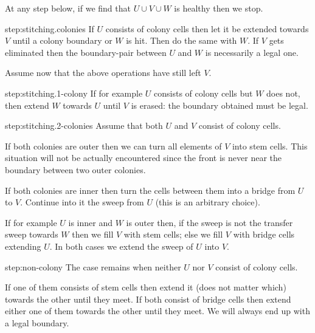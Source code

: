 \documentclass[11pt]{memoir}
\theoremstyle{definition} %
\begin{document}
\begin{Proof}
  At any step below, if we find that \( U\cup V\cup W \) is healthy then we stop.

\begin{step+}{step:stitching.colonies}
  If \( U \) consists of colony cells then let it be extended towards \( V \) until a colony boundary or \( W \)
  is hit.
  Then do the same with \( W \).
  If \( V \) gets eliminated then the boundary-pair
  between \( U \) and \( W \) is necessarily a legal one.
\end{step+}
Assume now that the above operations have still left \( V \).

\begin{step+}{step:stitching.1-colony}
  If for example \( U \) consists of colony cells but \( W \) does not, then extend \( W \) towards \( U \)
  until \( V \) is erased: the boundary obtained must be legal.
\end{step+}

\begin{step+}{step:stitching.2-colonies}
Assume that both \( U \) and \( V \) consist of colony cells.
\end{step+}
\begin{prooof}
  If both colonies are outer then we can turn all elements of \( V \) into stem cells.
  This situation will not be actually encountered since the front is never near the boundary between
  two outer colonies.

  If both colonies are inner then turn the cells between them into a bridge from \( U \) to \( V \).
  Continue into it the sweep from \( U \) (this is an arbitrary choice).

  If for example \( U \) is inner and \( W \) is outer then, if the sweep is not the transfer sweep
  towards \( W \) then we fill \( V \) with stem cells; else
  we fill \( V \) with bridge cells extending \( U \).
  In both cases we extend the sweep of \( U \) into \( V \).
\end{prooof} %

\begin{step+}{step:non-colony}
  The case remains when neither \( U \) nor \( V \) consist of colony cells.
\end{step+}
\begin{prooof}
  If one of them consists of stem cells then extend it (does not matter which)
  towards the other until they meet.
  If both consist of bridge cells then extend either one of them towards the other until they meet.
  We will always end up with a legal boundary.
\end{prooof} %
\end{Proof}
\end{document}
